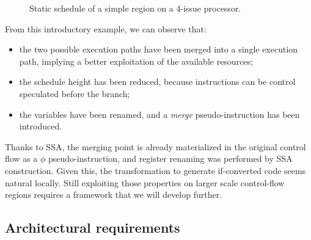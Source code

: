 \begin{figure}

\caption{Static schedule of a simple region on a 4-issue processor. }
\label{fig:example1}
\end{figure}

From this introductory example, we can observe that:
\begin{itemize}
\item the two possible execution paths have been merged into a single execution path, implying a  better exploitation of the available resources;  
\item the schedule height has been reduced, because instructions can be control speculated before the branch;
\item the variables have been renamed, and a \textit{merge} pseudo-instruction has been introduced.
\end{itemize}

Thanks to SSA, the merging point is already materialized in the original control flow as a $\phi$ pseudo-instruction, and register renaming was performed by SSA construction. 
Given this, the transformation to generate if-converted code seems natural locally. 
Still exploiting those properties on larger scale control-flow regions requires a framework that we will develop further.

\subsection{Architectural requirements}

